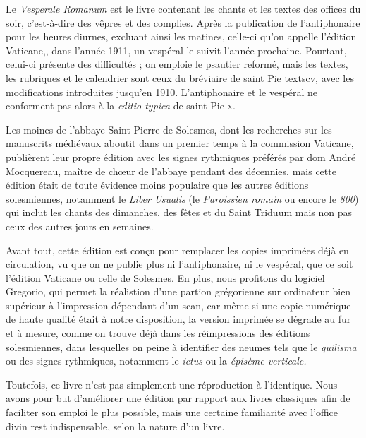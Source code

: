 
\begin{frpars}
Le \textit{Vesperale Romanum} est le livre contenant les chants et les textes des offices du soir, c’est-à-dire des vêpres et des complies. Après la publication de l'antiphonaire pour les heures diurnes, excluant ainsi les matines, celle-ci qu'on appelle l'édition Vaticane,, dans l'année 1911, un vespéral le suivit l'année prochaine. Pourtant, celui-ci présente des difficultés ; on emploie le psautier reformé, mais les textes, les rubriques et le calendrier sont ceux du bréviaire de saint Pie textsc{v}, avec les modifications introduites jusqu'en 1910. L'antiphonaire et le vespéral ne conforment pas alors à la \textit{editio typica} de saint Pie \textsc{x}.

Les moines de l'abbaye Saint-Pierre de Solesmes, dont les recherches sur les manuscrits médiévaux aboutit dans un premier temps à la commission Vaticane, publièrent leur propre édition avec les signes rythmiques préférés par dom André Mocquereau, maître de chœur de l'abbaye pendant des décennies, mais cette édition était de toute évidence moins populaire que les autres éditions solesmiennes, notamment le \textit{Liber Usualis} (le \textit{Paroissien romain} ou encore le \textit{800}) qui inclut les chants des dimanches, des fêtes et du Saint Triduum mais non pas ceux des autres jours en semaines.


Avant tout, cette édition est conçu pour remplacer les copies imprimées déjà en circulation, vu que on ne publie plus ni l'antiphonaire, ni le vespéral, que ce soit l'édition Vaticane ou celle de Solesmes. En plus, nous profitons du logiciel Gregorio, qui permet la réalistion d'une partion grégorienne sur ordinateur bien supérieur à l'impression dépendant d'un scan, car même si une copie numérique de haute qualité était à notre disposition, la version imprimée se dégrade au fur et à mesure, comme on trouve déjà dans les réimpressions des éditions solesmiennes, dans lesquelles on peine à identifier des neumes tels que le \textit{quilisma} ou des signes rythmiques, notamment le \textit{ictus} ou la \textit{épisème verticale.}

Toutefois, ce livre n'est pas simplement une réproduction à l'identique. Nous avons pour but d'améliorer une édition par rapport aux livres classiques afin de faciliter son emploi le plus possible, mais une certaine familiarité avec l'office divin rest indispensable, selon la nature d'un livre.


\end{frpars}
